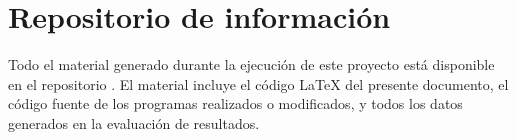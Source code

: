 \section{Repositorio de información}
\label{sec:repositorio}

Todo el material generado durante la ejecución de este proyecto está disponible en el repositorio \thegitrepo{}.  El material incluye el código \LaTeX{} del presente documento, el código fuente de los programas realizados o modificados, y todos los datos generados en la evaluación de resultados.